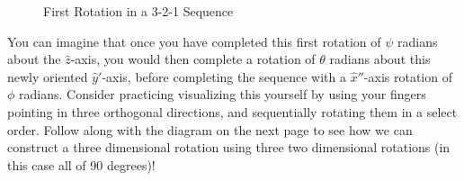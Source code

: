 \documentclass[10pt, openany, titlepage]{book}
\theoremstyle{definition}
\begin{document}
\begin{figure}[H]


    \caption{First Rotation in a 3-2-1 Sequence}
    \label{fig:first321}
\end{figure}

You can imagine that once you have completed this first rotation of $\psi$ radians about the $\hat{z}$-axis, you would then complete a rotation of $\theta$ radians about this newly oriented $\hat{y}'$-axis, before completing the sequence with a $\hat{x}''$-axis rotation of $\phi$ radians. Consider practicing visualizing this yourself by using your fingers pointing in three orthogonal directions, and sequentially rotating them in a select order. Follow along with the diagram on the next page to see how we can construct a three dimensional rotation using three two dimensional rotations (in this case all of 90 degrees)!
\end{document}
